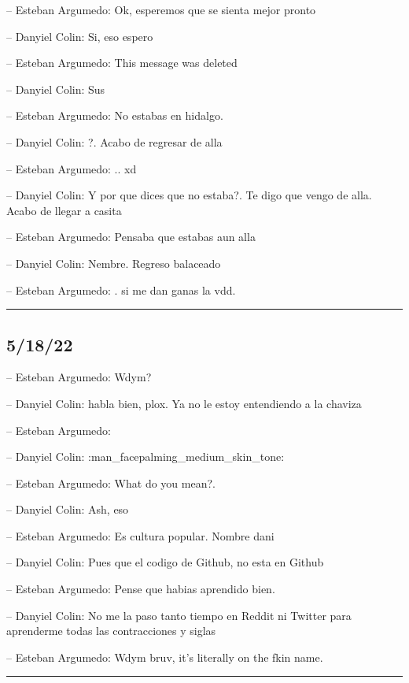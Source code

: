 -- Esteban Argumedo: Ok, esperemos que se sienta mejor pronto

-- Danyiel Colin: Si, eso espero

-- Esteban Argumedo: This message was deleted

-- Danyiel Colin: Sus

-- Esteban Argumedo: No estabas en hidalgo.

-- Danyiel Colin: ?. Acabo de regresar de alla

-- Esteban Argumedo: .. xd

-- Danyiel Colin: Y por que dices que no estaba?. Te digo que vengo de
alla. Acabo de llegar a casita

-- Esteban Argumedo: Pensaba que estabas aun alla

-- Danyiel Colin: Nembre. Regreso balaceado

-- Esteban Argumedo: . si me dan ganas la vdd.

\begin{center}\rule{0.5\linewidth}{0.5pt}\end{center}

\hypertarget{section-80}{%
\subsection{5/18/22}\label{section-80}}

-- Esteban Argumedo: Wdym?

-- Danyiel Colin: habla bien, plox. Ya no le estoy entendiendo a la
chaviza

-- Esteban Argumedo:

-- Danyiel Colin: :man\_facepalming\_medium\_skin\_tone:

-- Esteban Argumedo: What do you mean?.

-- Danyiel Colin: Ash, eso

-- Esteban Argumedo: Es cultura popular. Nombre dani

-- Danyiel Colin: Pues que el codigo de Github, no esta en Github

-- Esteban Argumedo: Pense que habias aprendido bien.

-- Danyiel Colin: No me la paso tanto tiempo en Reddit ni Twitter para
aprenderme todas las contracciones y siglas

-- Esteban Argumedo: Wdym bruv, it's literally on the fkin name.

\begin{center}\rule{0.5\linewidth}{0.5pt}\end{center}

